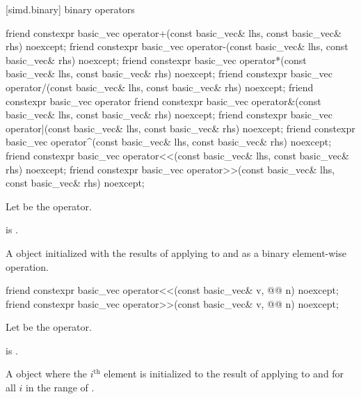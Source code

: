 [simd.binary]{ binary operators}

\begin{itemdecl}
friend constexpr basic_vec operator+(const basic_vec& lhs, const basic_vec& rhs) noexcept;
friend constexpr basic_vec operator-(const basic_vec& lhs, const basic_vec& rhs) noexcept;
friend constexpr basic_vec operator*(const basic_vec& lhs, const basic_vec& rhs) noexcept;
friend constexpr basic_vec operator/(const basic_vec& lhs, const basic_vec& rhs) noexcept;
friend constexpr basic_vec operator%
friend constexpr basic_vec operator&(const basic_vec& lhs, const basic_vec& rhs) noexcept;
friend constexpr basic_vec operator|(const basic_vec& lhs, const basic_vec& rhs) noexcept;
friend constexpr basic_vec operator^(const basic_vec& lhs, const basic_vec& rhs) noexcept;
friend constexpr basic_vec operator<<(const basic_vec& lhs, const basic_vec& rhs) noexcept;
friend constexpr basic_vec operator>>(const basic_vec& lhs, const basic_vec& rhs) noexcept;
\end{itemdecl}

\begin{itemdescr}
\pnum
Let  be the operator.

\pnum
\constraints
{} is
.

\pnum
\returns
A  object initialized with the results of applying
 to  and  as a binary element-wise
operation.
\end{itemdescr}

\begin{itemdecl}
friend constexpr basic_vec operator<<(const basic_vec& v, @@ n) noexcept;
friend constexpr basic_vec operator>>(const basic_vec& v, @@ n) noexcept;
\end{itemdecl}

\begin{itemdescr}
\pnum
Let  be the operator.

\pnum
\constraints
{} is .

\pnum
\returns
A  object where the $i^\text{th}$ element is initialized to
the result of applying  to  and  for all
$i$ in the range of .
\end{itemdescr}

